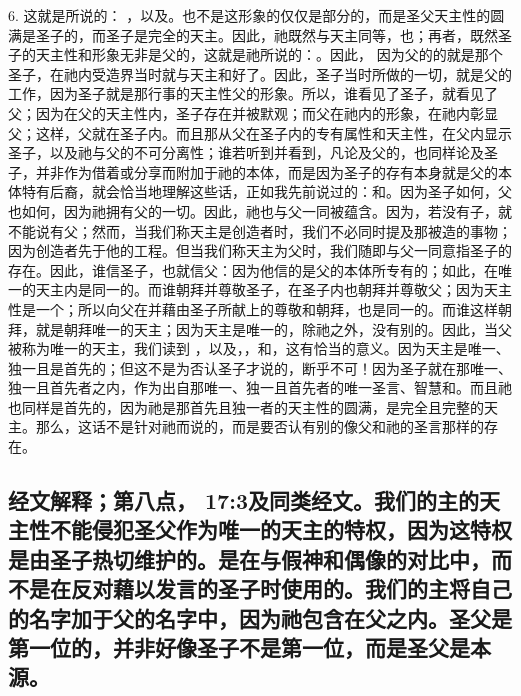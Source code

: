 6. 这就是所说的： ，以及。也不是这形象的仅仅是部分的，而是圣父天主性的圆满是圣子的，而圣子是完全的天主。因此，祂既然与天主同等，也；再者，既然圣子的天主性和形象无非是父的，这就是祂所说的：。因此， 因为父的的就是那个圣子，在祂内受造界当时就与天主和好了。因此，圣子当时所做的一切，就是父的工作，因为圣子就是那行事的天主性父的形象。所以，谁看见了圣子，就看见了父；因为在父的天主性内，圣子存在并被默观；而父在祂内的形象，在祂内彰显父；这样，父就在圣子内。而且那从父在圣子内的专有属性和天主性，在父内显示圣子，以及祂与父的不可分离性；谁若听到并看到，凡论及父的，也同样论及圣子，并非作为借着或分享而附加于祂的本体，而是因为圣子的存有本身就是父的本体特有后裔，就会恰当地理解这些话，正如我先前说过的：和。因为圣子如何，父也如何，因为祂拥有父的一切。因此，祂也与父一同被蕴含。因为，若没有子，就不能说有父；然而，当我们称天主是创造者时，我们不必同时提及那被造的事物；因为创造者先于他的工程。但当我们称天主为父时，我们随即与父一同意指圣子的存在。因此，谁信圣子，也就信父：因为他信的是父的本体所专有的；如此，在唯一的天主内是同一的。而谁朝拜并尊敬圣子，在圣子内也朝拜并尊敬父；因为天主性是一个；所以向父在并藉由圣子所献上的尊敬和朝拜，也是同一的。而谁这样朝拜，就是朝拜唯一的天主；因为天主是唯一的，除祂之外，没有别的。因此，当父被称为唯一的天主，我们读到 ，以及，，和，这有恰当的意义。因为天主是唯一、独一且是首先的；但这不是为否认圣子才说的，断乎不可！因为圣子就在那唯一、独一且首先者之内，作为出自那唯一、独一且首先者的唯一圣言、智慧和。而且祂也同样是首先的，因为祂是那首先且独一者的天主性的圆满，是完全且完整的天主。那么，这话不是针对祂而说的，而是要否认有别的像父和祂的圣言那样的存在。\par


\subsection{经文解释；第八点， 17:3及同类经文。我们的主的天主性不能侵犯圣父作为唯一的天主的特权，因为这特权是由圣子热切维护的。是在与假神和偶像的对比中，而不是在反对藉以发言的圣子时使用的。我们的主将自己的名字加于父的名字中，因为祂包含在父之内。圣父是第一位的，并非好像圣子不是第一位，而是圣父是本源。}


